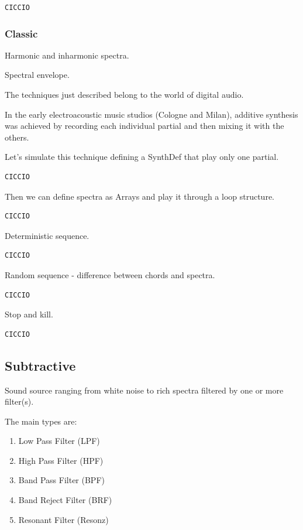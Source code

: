 \begin{lstlisting}[frame=single] 
CICCIO
\end{lstlisting}

\subsubsection{Classic}\label{classic}

Harmonic and inharmonic spectra.

Spectral envelope.

The techniques just described belong to the world of digital audio.

In the early electroacoustic music studios (Cologne and Milan), additive synthesis was achieved by recording each individual partial and then mixing it with the others.

Let's simulate this technique defining a SynthDef that play only one partial.

\begin{lstlisting}[frame=single] 
CICCIO
\end{lstlisting}

Then we can define spectra as Arrays and play it through a loop structure.

\begin{lstlisting}[frame=single] 
CICCIO
\end{lstlisting}

Deterministic sequence.

\begin{lstlisting}[frame=single] 
CICCIO
\end{lstlisting}

Random sequence - difference between chords and spectra.

\begin{lstlisting}[frame=single] 
CICCIO
\end{lstlisting}

Stop and kill.

\begin{lstlisting}[frame=single] 
CICCIO
\end{lstlisting}

\subsection{Subtractive}\label{subtractive}

Sound source ranging from white noise to rich spectra filtered by one or more filter(s).

The main types are:
\begin{enumerate}
\tightlist
\item Low Pass Filter (LPF) 
\item High Pass Filter (HPF) 
\item Band Pass Filter (BPF) 
\item Band Reject Filter (BRF) 
\item Resonant Filter (Resonz)
\end{enumerate}

